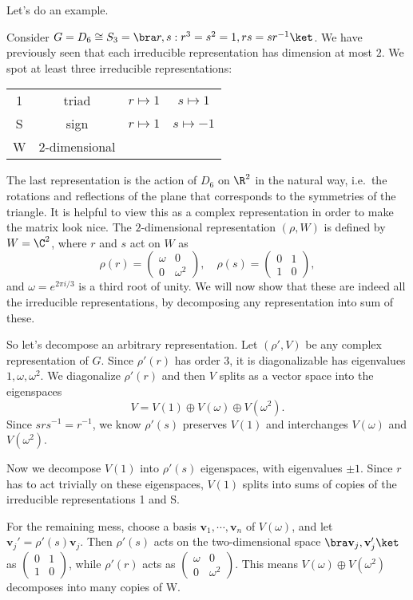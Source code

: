 \documentclass[a4paper]{article}
\begin{document}
Let's do an example.
\begin{eg}
  Consider $G = D_6 \cong S_3 = \bra r, s: r^3 = s^2 = 1, rs = sr^{-1}\ket$. We have previously seen that each irreducible representation has dimension at most $2$. We spot at least three irreducible representations:
  \begin{center}
    \begin{tabular}{cccc}
      1 & triad & $r \mapsto 1$ & $s \mapsto 1$\\
      S & sign & $r \mapsto 1$ & $s \mapsto -1$\\
      W & $2$-dimensional &
    \end{tabular}
  \end{center}
  The last representation is the action of $D_6$ on $\R^2$ in the natural way, i.e.\ the rotations and reflections of the plane that corresponds to the symmetries of the triangle. It is helpful to view this as a complex representation in order to make the matrix look nice. The $2$-dimensional representation $(\rho, W)$ is defined by $W = \C^2$, where $r$ and $s$ act on $W$ as
  \[
    \rho(r) =
    \begin{pmatrix}
      \omega & 0\\
      0 & \omega^2
    \end{pmatrix},\quad
    \rho(s) =
    \begin{pmatrix}
      0 & 1\\
      1 & 0
    \end{pmatrix},
  \]
  and $\omega = e^{2\pi i/3}$ is a third root of unity. We will now show that these are indeed all the irreducible representations, by decomposing any representation into sum of these.

  So let's decompose an arbitrary representation. Let $(\rho', V)$ be any complex representation of $G$. Since $\rho'(r)$ has order $3$, it is diagonalizable has eigenvalues $1, \omega, \omega^2$. We diagonalize $\rho'(r)$ and then $V$ splits as a vector space into the eigenspaces
  \[
    V = V(1) \oplus V(\omega) \oplus V(\omega^2).
  \]
  Since $srs^{-1}= r^{-1}$, we know $\rho'(s)$ preserves $V(1)$ and interchanges $V(\omega)$ and $V(\omega^2)$.

  Now we decompose $V(1)$ into $\rho'(s)$ eigenspaces, with eigenvalues $\pm1$. Since $r$ has to act trivially on these eigenspaces, $V(1)$ splits into sums of copies of the irreducible representations 1 and S.

  For the remaining mess, choose a basis $\mathbf{v}_1, \cdots, \mathbf{v}_n$ of $V(\omega)$, and let $\mathbf{v}_j' = \rho'(s) \mathbf{v}_j$. Then $\rho'(s)$ acts on the two-dimensional space $\bra \mathbf{v}_j, \mathbf{v}_j'\ket$ as $\begin{pmatrix}0 & 1\\1 & 0\end{pmatrix}$, while $\rho'(r)$ acts as $\begin{pmatrix} \omega & 0\\0 & \omega^2\end{pmatrix}$. This means $V(\omega) \oplus V(\omega^2)$ decomposes into many copies of W.
\end{eg}
\end{document}
